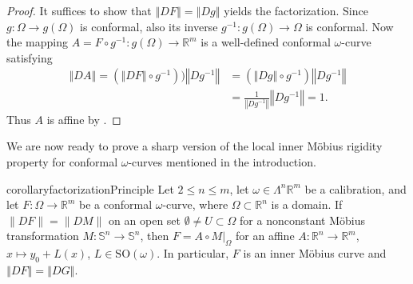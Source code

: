 \documentclass[a4paper,leqno,11pt]{amsart}
\numberwithin{equation}{section}
\theoremstyle{remark}
\theoremstyle{remark}
\renewcommand{\S}{\mathbb{S}}
\newcommand{\R}{\mathbb{R}}
\newcommand{\norm}[1]{ \left\Vert #1 \right\Vert }	%
\newcommand{\SO}{\mathrm{SO}}
\begin{document}
\begin{proof}
It suffices to show that $\norm{DF} = \norm{Dg}$ yields the factorization. Since $g \colon \Omega \to g(\Omega)$ is conformal, also its inverse $g^{-1} \colon g(\Omega) \to \Omega$ is conformal. Now the mapping $A = F \circ g^{-1} \colon g(\Omega) \to \R^m$ is a well-defined conformal $\omega$-curve satisfying 
\begin{align*}
\norm{DA} = (\norm{DF} \circ g^{-1})) \norm{Dg^{-1}} &= (\norm{Dg} \circ g^{-1})\norm{Dg^{-1}} 
    \\
    &= \frac{1}{\norm{Dg^{-1}}} \norm{Dg^{-1}} = 1.
\end{align*}
Thus $A$ is affine by .
\end{proof}


We are now ready to prove a sharp version of the local inner M\"obius rigidity property for conformal $\omega$-curves mentioned in the introduction.

\begin{restatable}
{corollary}{factorizationPrinciple}
\label{cor:comparison-principle}
Let $2\le n \le m$, let $\omega \in \Lambda^n \R^m$ be a calibration, and let $F\colon \Omega \to \R^m$ be a conformal $\omega$-curve, where $\Omega \subset \R^n$ is a domain. If $\|DF\| = \|DM\|$ on an open set $\emptyset \neq U \subset \Omega$ for a nonconstant Möbius transformation $M \colon \S^n \to \S^n$, then $F = A \circ M|_{\Omega}$ for an affine $A \colon \R^n \to \R^m$, $x \mapsto y_0 + L(x)$, $L \in \SO( \omega )$. In particular, $F$ is an inner Möbius curve and $\norm{DF} = \norm{DG}$.
\end{restatable}
\end{document}
